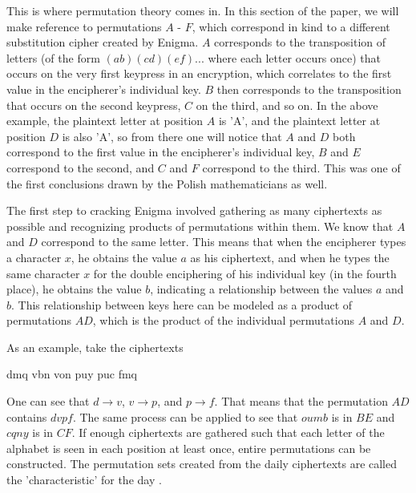 This is where permutation theory comes in. In this section of the paper, we will make reference to permutations $A$ - $F$, which correspond in kind to a different substitution cipher created by Enigma. $A$ corresponds to the transposition of letters (of the form $(ab)(cd)(ef)...$ where each letter occurs once) that occurs on the very first keypress in an encryption, which correlates to the first value in the encipherer's individual key. $B$ then corresponds to the transposition that occurs on the second keypress, $C$ on the third, and so on. In the above example, the plaintext letter at position $A$ is 'A', and the plaintext letter at position $D$ is also 'A', so from there one will notice that $A$ and $D$ both correspond to the first value in the encipherer's individual key, $B$ and $E$ correspond to the second, and $C$ and $F$ correspond to the third. This was one of the first conclusions drawn by the Polish mathematicians as well.

The first step to cracking Enigma involved gathering as many ciphertexts as possible and recognizing products of permutations within them. We know that $A$ and $D$ correspond to the same letter. This means that when the encipherer types a character $x$, he obtains the value $a$ as his ciphertext, and when he types the same character $x$ for the double enciphering of his individual key (in the fourth place), he obtains the value $b$, indicating a relationship between the values $a$ and $b$. This relationship between keys here can be modeled as a product of permutations $AD$, which is the product of the individual permutations $A$ and $D$.

As an example, take the ciphertexts

\begin{CVerbatim}[fontsize=\small]
dmq vbn
von puy
puc fmq
\end{CVerbatim}

One can see that $d \rightarrow v$, $v \rightarrow p$, and $p \rightarrow f$. That means that the permutation $AD$ contains $dvpf$. The same process can be applied to see that $oumb$ is in $BE$ and $cqny$ is in $CF$. If enough ciphertexts are gathered such that each letter of the alphabet is seen in each position at least once, entire permutations can be constructed. The permutation sets created from the daily ciphertexts are called the 'characteristic' for the day \cite{wk85}.

